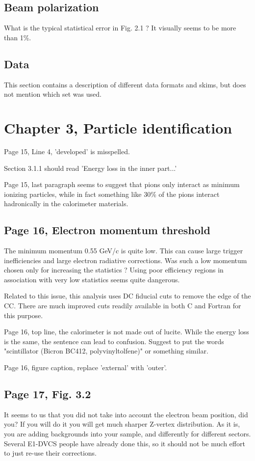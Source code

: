 \documentclass[11pt]{paper}
\begin{document}
\subsection*{Beam polarization}

What is the typical statistical error in Fig. 2.1 ?
It visually seems to be more than 1\%.

\subsection*{Data}

This section contains a description of different data formats and skims, but does not mention which set was used.

\section*{Chapter 3, Particle identification}
Page 15, Line 4, 'developed' is misspelled.

\noindent Section 3.1.1 should read 'Energy loss in the inner part...'

\noindent Page 15, last paragraph seems to suggest that pions only interact as minimum ionizing particles, while in fact something like 30\% of the pions interact hadronically in the calorimeter materials.

 \subsection*{Page 16, Electron momentum threshold}
The minimum momentum 0.55 GeV/c is quite low.
This can cause large trigger inefficiencies and large electron radiative corrections.
Was such a low momentum chosen only for increasing the statistics ?
Using poor efficiency regions in association with very low statistics seems quite dangerous.

Related to this issue, this analysis uses DC fiducial cuts to remove the edge of the CC.
There are much improved cuts readily available in both C and Fortran for this purpose. 

Page 16, top line, the calorimeter is not made out of lucite. While the energy loss is the same, the sentence can lead to confusion. Suggest to put the words "scintillator (Bicron BC412, polyvinyltolfene)" or something similar.

Page 16, figure caption, replace 'external' with 'outer'.

\subsection*{Page 17, Fig. 3.2} It seems to us that you did not take into account the electron beam position, did you?
If you will do it you will get much sharper Z-vertex distribution. As it is, you are adding backgrounds into your sample, and differently for different sectors. Several E1-DVCS people have already done this, so it should not be much effort to just re-use their corrections.
\end{document}

